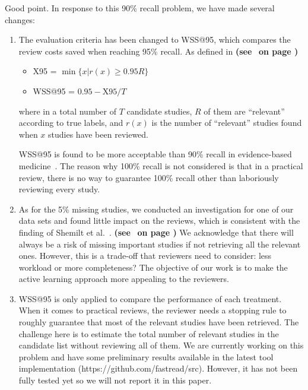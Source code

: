 \documentclass{svjour3}
\theoremstyle{break}
\newcommand{\citeresp}[1]{
{\bf (see } \fcolorbox{black}{black!15}{
 \bf
  \scriptsize R-{#1}}~{\bf{on page \pageref{response:#1})}}
}
\begin{document}
Good point. In response to this 90\% recall problem, we have made several changes:

\begin{enumerate}
\item
The evaluation criteria has been changed to WSS@95, which compares the review costs saved when reaching 95\% recall. As defined in \citeresp{1b1}
\begin{itemize}
\item
X95 = $\min \{x | r(x)\geq0.95 R\}$
\item
WSS@95 = $0.95-\text{X95}/T$
\end{itemize}
where in a total number of $T$ candidate studies, $R$ of them are ``relevant'' according to true labels, and $r(x)$ is the number of ``relevant'' studies found when $x$ studies have been reviewed.

WSS@95 is found to be more acceptable than 90\% recall in evidence-based medicine~\cite{o2015using,cohen2006reducing,cohen2011performance}. The reason why 100\% recall is not considered is that   in a practical review, there is no way to guarantee 100\% recall other than laboriously reviewing every study.

\item
As for the 5\% missing studies, we conducted an investigation for one of our data sets and found little impact on the reviews, which is consistent with the finding of Shemilt et al.~\cite{shemilt2016use}. \citeresp{1b2} We acknowledge that there will always be a risk of missing important studies if not retrieving all the relevant ones. However, this is a trade-off that reviewers need to consider: less workload or more completeness? The objective of our work is to make the active learning approach more appealing to the reviewers.

\item
WSS@95 is only applied to compare the performance of each treatment. When it comes to practical reviews, the reviewer needs a stopping rule to roughly guarantee that most of the relevant studies have been retrieved. The challenge here is to estimate the total number of relevant studies in the candidate list without reviewing all of them. We are currently working on this problem and have some preliminary results available in the latest tool implementation (https://github.com/fastread/src). However, it has not been fully tested yet so we will not report it in this paper.

\end{enumerate}
\end{document}
